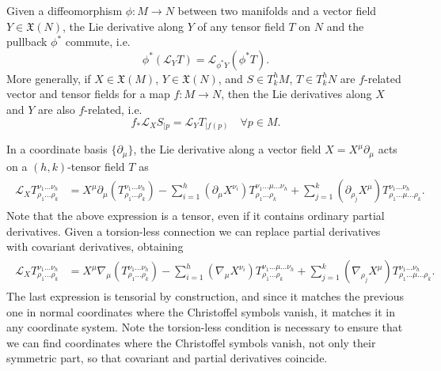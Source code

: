 \documentclass[../geometry_main.tex]{subfiles}
\begin{document}
\begin{mytheorem}
Given a diffeomorphism $\phi: M \to N$ between two manifolds and a vector field $Y\in \mathfrak{X}(N)$, the Lie derivative along $Y$ of any tensor field $T$ on $N$ and the pullback $\phi^*$ commute, i.e.
\begin{equation}
    \phi^* (\mathcal{L}_Y T) = \mathcal{L}_{\phi^* Y} (\phi^* T).
\end{equation}
%
More generally, if $X\in \mathfrak{X}(M)$, $Y\in \mathfrak{X}(N)$, and $S\in T^h_kM$, $T\in T^h_kN$ are $f$-related vector and tensor fields for a map $f:M\to N$, then the Lie derivatives along $X$ and $Y$ are also $f$-related, i.e.
\begin{equation}
    f_*\mathcal{L}_XS_{|p}= \mathcal{L}_Y T_{|f(p)} \quad \forall p\in M.
\end{equation}
\end{mytheorem}



\begin{mytheorem}
In a coordinate basis $\{\partial_\mu\}$, the Lie derivative along a vector field $X = X^{\mu} \partial_\mu$ acts on a $(h,k)$-tensor field $T$ as
\begin{align}
\begin{aligned}
    \mathcal{L}_X T^{\nu_1 \dots \nu_h}_{ \rho_1 \dots \rho_k} 
    &= X^{\mu} \partial_\mu\left( T^{\nu_1 \dots \nu_h}_{ \rho_1 \dots \rho_k} \right)
    - \sum_{i=1}^h \left(\partial_\mu X^{\nu_i}\right) T^{\nu_1 \dots \mu \dots \nu_h}_{ \rho_1 \dots \rho_k} 
    + \sum_{j=1}^k \left(\partial_{\rho_j} X^{\mu}\right) T^{\nu_1 \dots \nu_h}_{\rho_1 \dots \mu \dots \rho_k}.
\end{aligned}  
\end{align}
Note that the above expression is a tensor, even if it contains ordinary partial derivatives.
Given a torsion-less connection we can replace partial derivatives with covariant derivatives, obtaining
\begin{align}
\begin{aligned}
    \mathcal{L}_X T^{\nu_1 \dots \nu_h}_{ \rho_1 \dots \rho_k} 
    &= X^{\mu} \nabla_\mu\left( T^{\nu_1 \dots \nu_h}_{ \rho_1 \dots \rho_k} \right)
    - \sum_{i=1}^h \left(\nabla_\mu X^{\nu_i}\right) T^{\nu_1 \dots \mu \dots \nu_h}_{ \rho_1 \dots \rho_k} 
    + \sum_{j=1}^k \left(\nabla_{\rho_j} X^{\mu}\right) T^{\nu_1 \dots \nu_h}_{\rho_1 \dots \mu \dots \rho_k}.
\end{aligned}
\end{align}
The last expression is tensorial by construction, and since it matches the previous one in normal coordinates where the Christoffel symbols vanish, it matches it in any coordinate system.
Note the torsion-less condition is necessary to ensure that we can find coordinates where the Christoffel symbols vanish, not only their symmetric part, so that covariant and partial derivatives coincide.
\end{mytheorem}
\end{document}
